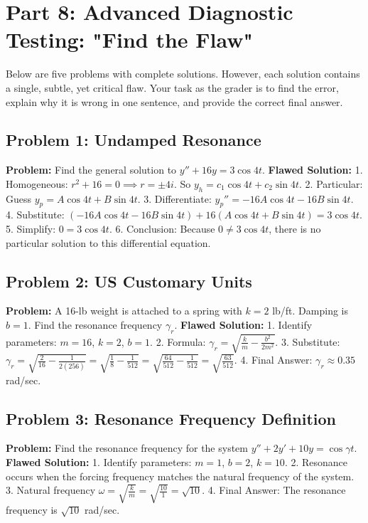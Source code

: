 \documentclass[11pt]{article}
\begin{document}
\newpage
\section{Part 8: Advanced Diagnostic Testing: "Find the Flaw"}

Below are five problems with complete solutions. However, each solution contains a single, subtle, yet critical flaw. Your task as the grader is to find the error, explain why it is wrong in one sentence, and provide the correct final answer.

\subsection{Problem 1: Undamped Resonance}
\textbf{Problem:} Find the general solution to $y'' + 16y = 3 \cos 4t$.
\textbf{Flawed Solution:}
1. Homogeneous: $r^2 + 16 = 0 \implies r = \pm 4i$. So $y_h = c_1 \cos 4t + c_2 \sin 4t$.
2. Particular: Guess $y_p = A \cos 4t + B \sin 4t$.
3. Differentiate: $y_p'' = -16A \cos 4t - 16B \sin 4t$.
4. Substitute: $(-16A \cos 4t - 16B \sin 4t) + 16(A \cos 4t + B \sin 4t) = 3 \cos 4t$.
5. Simplify: $0 = 3 \cos 4t$.
6. Conclusion: Because $0 \neq 3 \cos 4t$, there is no particular solution to this differential equation.

\subsection{Problem 2: US Customary Units}
\textbf{Problem:} A 16-lb weight is attached to a spring with $k=2$ lb/ft. Damping is $b=1$. Find the resonance frequency $\gamma_r$.
\textbf{Flawed Solution:}
1. Identify parameters: $m = 16$, $k = 2$, $b = 1$.
2. Formula: $\gamma_r = \sqrt{\frac{k}{m} - \frac{b^2}{2m^2}}$.
3. Substitute: $\gamma_r = \sqrt{\frac{2}{16} - \frac{1}{2(256)}} = \sqrt{\frac{1}{8} - \frac{1}{512}} = \sqrt{\frac{64}{512} - \frac{1}{512}} = \sqrt{\frac{63}{512}}$.
4. Final Answer: $\gamma_r \approx 0.35$ rad/sec.

\subsection{Problem 3: Resonance Frequency Definition}
\textbf{Problem:} Find the resonance frequency for the system $y'' + 2y' + 10y = \cos \gamma t$.
\textbf{Flawed Solution:}
1. Identify parameters: $m = 1$, $b = 2$, $k = 10$.
2. Resonance occurs when the forcing frequency matches the natural frequency of the system.
3. Natural frequency $\omega = \sqrt{\frac{k}{m}} = \sqrt{\frac{10}{1}} = \sqrt{10}$.
4. Final Answer: The resonance frequency is $\sqrt{10}$ rad/sec.
\end{document}
